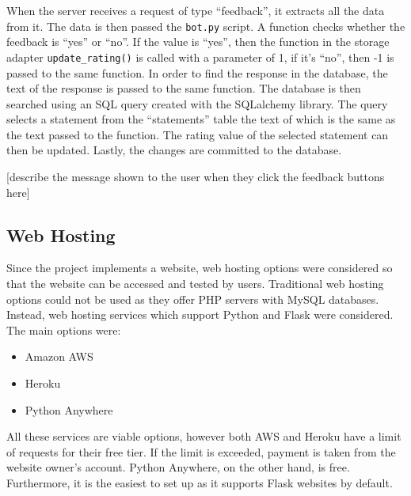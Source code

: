 \documentclass[12pt,a4paper]{article}
\begin{document}
When the server receives a request of type “feedback”, it extracts all the data from it. The data is then passed the \texttt{bot.py} script. A function checks whether the feedback is “yes” or “no”. If the value is “yes”, then the function in the storage adapter \texttt{update\_rating()} is called with a parameter of 1, if it’s “no”, then -1 is passed to the same function. In order to find the response in the database, the text of the response is passed to the same function. The database is then searched using an SQL query created with the SQLalchemy library. The query selects a statement from the “statements” table the text of which is the same as the text passed to the function. The rating value of the selected statement can then be updated. Lastly, the changes are committed to the database.

[describe the message shown to the user when they click the feedback buttons here]

\subsection{Web Hosting}
Since the project implements a website, web hosting options were considered so that the website can be accessed and tested by users. Traditional web hosting options could not be used as they offer PHP servers with MySQL databases. Instead, web hosting services which support Python and Flask were considered. The main options were:
\begin{itemize}
	\item Amazon AWS 
    \item Heroku
	\item Python Anywhere
\end{itemize}

All these services are viable options, however both AWS and Heroku have a limit of requests for their free tier. If the limit is exceeded, payment is taken from the website owner’s account. Python Anywhere, on the other hand, is free. Furthermore, it is the easiest to set up as it supports Flask websites by default.

\newpage
\end{document}
